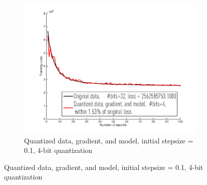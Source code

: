 \documentclass{article}
\begin{document}
\begin{figure}[h]
\begin{subfigure}[h]{.3\columnwidth}
    \includegraphics[width=\columnwidth]{lr/real/cadata/dgm01}
     \caption{Quantized data, gradient, and model, initial stepsize = 0.1, 4-bit quantization}
    \end{subfigure}
    

\end{figure}
\end{document}
